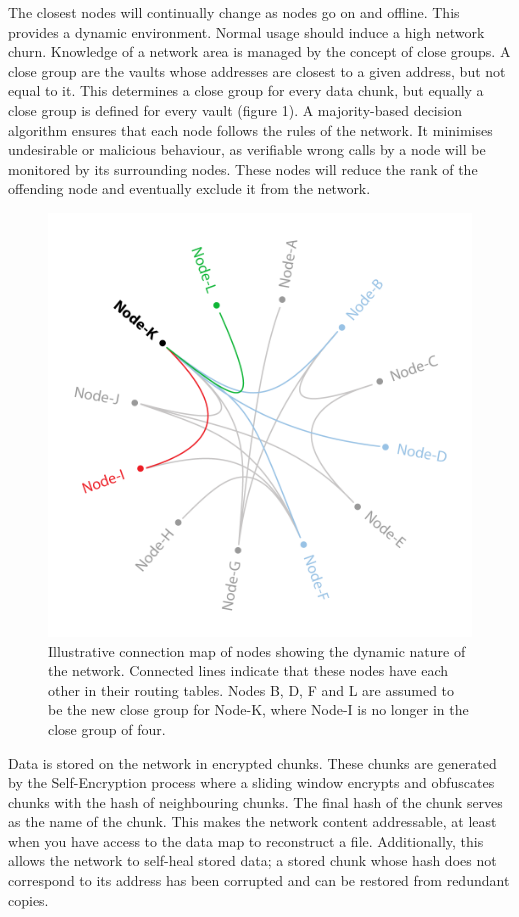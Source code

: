 \documentclass[twocolumn,english]{article}
\begin{document}
The closest nodes will continually change as nodes go on and offline. This provides a dynamic environment.  Normal usage should  induce a high network churn. Knowledge of a network area is managed by the concept of close groups.  A close group are the vaults whose addresses are closest to a given address, but not equal to it.  This determines a close group for every data chunk, but equally a close group is defined for every vault (figure 1).
A majority-based decision algorithm ensures that each node follows the rules of the network. It minimises undesirable or malicious behaviour, as verifiable wrong calls by a node will be monitored by its surrounding nodes.  These nodes will reduce the rank of the offending node and eventually exclude it from the network.\cite{msVault}
\begin{figure}[hbpt]
\centering
\includegraphics[scale=0.2]{connection-map.png}
\caption{Illustrative connection map of nodes showing the dynamic nature of the network. Connected lines indicate that these nodes have each other in their routing tables.  Nodes B, D, F and L are assumed to be the new close group for Node-K, where Node-I is no longer in the close group of four.}
\end{figure}

Data is stored on the network in encrypted chunks. These chunks are generated by the Self-Encryption process where a sliding window encrypts and obfuscates chunks with the hash of neighbouring chunks. The final hash of the chunk serves as the name of the chunk.  This makes the network content addressable, at least when you have access to the data map to reconstruct a file\cite{msEncrypt}. Additionally, this allows the network to self-heal stored data; a stored chunk whose hash does not correspond to its address has been corrupted and can be restored from redundant copies.
\end{document}

